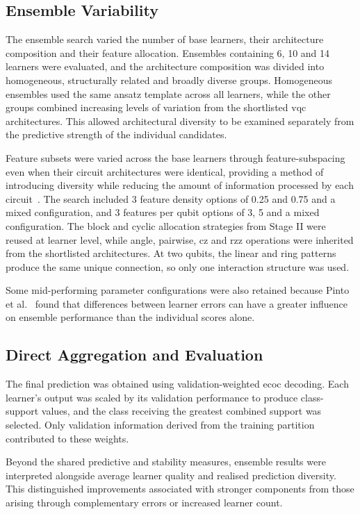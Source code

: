 \documentclass[]{UCD_CS_MSc_AAI_Report}
\begin{document}
\subsection{Ensemble Variability}

The ensemble search varied the number of base learners, their architecture composition and their feature allocation. Ensembles containing 6, 10 and 14 learners were evaluated, and the architecture composition was divided into homogeneous, structurally related and broadly diverse groups. Homogeneous ensembles used the same ansatz template across all learners, while the other groups combined increasing levels of variation from the shortlisted \ac{vqc} architectures. This allowed architectural diversity to be examined separately from the predictive strength of the individual candidates.

Feature subsets were varied across the base learners through \gls{feature-subspacing} even when their circuit architectures were identical, providing a method of introducing diversity while reducing the amount of information processed by each circuit~\cite{radojicic_reducing_2026}. The search included 3 feature density options of 0.25 and 0.75 and a mixed configuration, and 3 features per qubit options of 3, 5 and a mixed configuration. The block and cyclic allocation strategies from Stage II were reused at learner level, while angle, pairwise, \acs{cz} and \acs{rzz} operations were inherited from the shortlisted architectures. At two qubits, the linear and ring patterns produce the same unique connection, so only one interaction structure was used.

Some mid-performing parameter configurations were also retained because Pinto et al.~\cite{pinto_composing_2026} found that differences between learner errors can have a greater influence on ensemble performance than the individual scores alone.

\subsection{Direct Aggregation and Evaluation}

The final prediction was obtained using validation-weighted \ac{ecoc} decoding. Each learner's output was scaled by its validation performance to produce class-support values, and the class receiving the greatest combined support was selected. Only validation information derived from the training partition contributed to these weights.

Beyond the shared predictive and stability measures, ensemble results were interpreted alongside average learner quality and realised prediction diversity. This distinguished improvements associated with stronger components from those arising through complementary errors or increased learner count.
\end{document}
